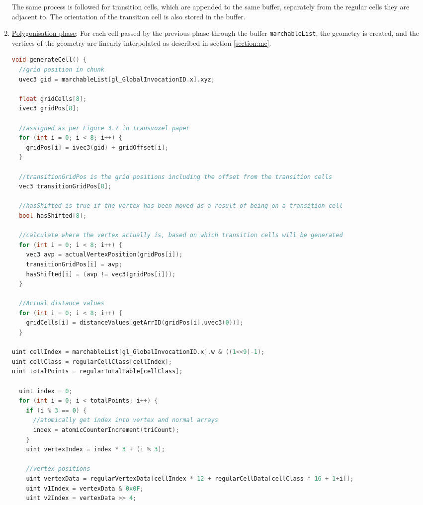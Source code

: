 \documentclass[11pt]{article}
\begin{document}
\begin{enumerate}
The same process is followed for transition cells, which are appended to the same buffer, separately from the regular cells they are adjacent to. The orientation of the transition cell is also stored in the buffer.

\item \underline{Polygonisation phase}: For each cell passed by the previous phase through the buffer \texttt{marchableList}, the geometry is created, and the vertices of the geometry are linearly interpolated as described in section \ref{section:mc}. 

\begin{lstlisting}[language=C++,label={tv_poly_regular},caption={Code for generating the geometry in a regular cell.}]
void generateCell() {
  //grid position in chunk
  uvec3 gid = marchableList[gl_GlobalInvocationID.x].xyz;

  float gridCells[8];
  ivec3 gridPos[8];

  //assigned as per Figure 3.7 in transvoxel paper
  for (int i = 0; i < 8; i++) {
    gridPos[i] = ivec3(gid) + gridOffset[i];
  }

  //transitionGridPos is the grid positions including the offset from the transition cells
  vec3 transitionGridPos[8];

  //hasShifted is true if the vertex has been moved as a result of being on a transition cell
  bool hasShifted[8];

  //calculate where the vertex actually is, based on which transition cells will be generated
  for (int i = 0; i < 8; i++) {
    vec3 avp = actualVertexPosition(gridPos[i]);
    transitionGridPos[i] = avp;
    hasShifted[i] = (avp != vec3(gridPos[i]));
  }

  //Actual distance values
  for (int i = 0; i < 8; i++) {
    gridCells[i] = distanceValues[getArrID(gridPos[i],uvec3(0))];
  }

uint cellIndex = marchableList[gl_GlobalInvocationID.x].w & ((1<<9)-1);
uint cellClass = regularCellClass[cellIndex];
uint totalPoints = regularTotalTable[cellClass];

  uint index = 0;
  for (int i = 0; i < totalPoints; i++) {
    if (i % 3 == 0) {
      //atomically get index into vertex and normal arrays
      index = atomicCounterIncrement(triCount);
    }
    uint vertexIndex = index * 3 + (i % 3);

    //vertex positions
    uint vertexData = regularVertexData[cellIndex * 12 + regularCellData[cellClass * 16 + 1+i]];
    uint v1Index = vertexData & 0x0F;
    uint v2Index = vertexData >> 4;


\end{lstlisting}
\end{enumerate}
\end{document}
